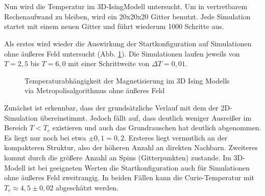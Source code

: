 \

\

Nun wird die Temperatur im 3D-IsingModell untersucht. Um in vertretbarem Rechenaufwand zu bleiben, wird ein 20x20x20 Gitter benutzt. Jede Simulation startet mit einem neuen Gitter und führt wiederum 1000 Schritte aus.


Als erstes wird wieder die Auswirkung der Startkonfiguration auf Simulationen ohne äußeres Feld untersucht (Abb. \ref{mp3d0modes}). Die Simulationen laufen jeweils von $T=2,5$ bis $T=6,0$ mit einer Schrittweite von $\Delta T= 0,01$.
\begin{figure}[H]
	\centering
	\caption{Temperaturabhängigkeit der Magnetisierung im 3D Ising Modells via Metropolisalgorithmus ohne äußeres Feld}
	\label{mp3d0modes}
\end{figure}
Zunächst ist erkennbar, dass der grundsätzliche Verlauf mit dem der 2D-Simulation übereinstimmt. Jedoch fällt auf, dass deutlich weniger Ausreißer im Bereich $T<T_{c}$ existieren und auch das Grundrauschen hat deutlich abgenommen. Es liegt nur noch bei etwa $\pm 0,1 = 0,2$. Ersteres liegt vermutlich an der kompakteren Struktur, also der höheren Anzahl an direkten Nachbarn. Zweiteres kommt durch die größere Anzahl an Spins (Gitterpunkten) zustande. Im 3D-Modell ist bei geeigneten Werten die Startkonfiguration auch für Simulationen ohne äußeres Feld zweitrangig. In beiden Fällen kann die Curie-Temperatur mit $T_{c}\approx 4,5\pm 0,02$ abgeschätzt werden.


